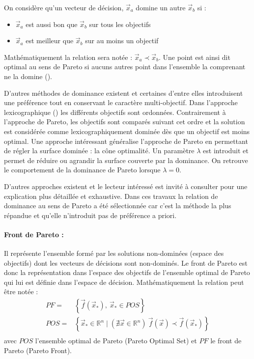 \noindent On considère qu’un vecteur de décision, $\vec{x}_{a}$ domine un autre $\vec{x}_{b}$ si :
\begin{itemize}
  \item $\vec{x}_{a}$ est aussi bon que $\vec{x}_{b}$ sur tous les objectifs
  \item $\vec{x}_{a}$ est meilleur que $\vec{x}_{b}$ sur au moins un objectif
\end{itemize}
Mathématiquement la relation sera notée : $\vec{x}_{a} \prec \vec{x}_{b}$.
Une point est ainsi dit optimal au sens de Pareto si aucuns autres point dans
l’ensemble la comprenant ne la domine ().

D’autres méthodes de dominance existent et certaines d’entre elles introduisent
une préférence tout en conservant le caractère multi-objectif.
Dans l’approche lexicographique () les différents objectifs
sont ordonnées. Contrairement à l’approche de Pareto, les objectifs sont comparés
suivant cet ordre et la solution est considérée comme lexicographiquement dominée dès
que un objectif est moins optimal.
Une approche intéressant généralise l’approche de Pareto en permettant de régler
la surface dominée : la cône optimalité. Un paramètre $\lambda$ est introduit et
permet de réduire ou agrandir la surface couverte par la dominance. On retrouve le
comportement de la dominance de Pareto lorsque $\lambda = 0$.

D’autres approches existent et le lecteur intéressé est invité à consulter \cite{Collette2002}
pour une explication plus détaillée et exhaustive. Dans ces travaux la relation de
dominance au sens de Pareto a été sélectionnée car c’est la méthode la plus répandue
et qu’elle n’introduit pas de préférence a priori.

\paragraph{Front de Pareto :} %
\label{par:front_de_pareto}
Il représente l’ensemble formé par les solutions non-dominées (espace des objectifs)
dont les vecteurs de décisions sont non-dominés.
Le front de Pareto est donc la représentation dans l’espace des objectifs
de l’ensemble optimal de Pareto qui lui est définie dans l’espace de décision.
Mathématiquement la relation peut être notée :
\begin{equation}
  \begin{aligned}
    PF   =& \left\{ \vec{f}(\vec{x}_{*}), \  \vec{x}_{*} \in POS \right\} \\
    POS  =& \left\{ \vec{x}_{*} \in \mathbb{R}^{n} \mid (\nexists \vec{x} \in \mathbb{R}^{n}) \  \vec{f}(\vec{x}) \prec \vec{f}(\vec{x}_{*}) \right\} \\
  \end{aligned}
\end{equation}
avec $POS$ l’ensemble optimal de Pareto (Pareto Optimal Set) et $PF$ le front de Pareto
(Pareto Front).

